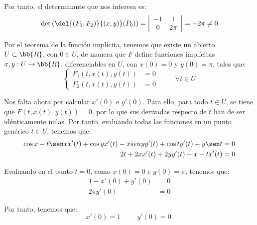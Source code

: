 \begin{ejercicio}
    Por tanto, el determinante que nos interesa es:
    \begin{equation*}
        \det \left( \del{(F_1,F_2)}{(x,y)}(P_0) \right) =
        \left|
            \begin{array}{cc}
                -1 & 1 \\
                0 & 2\pi
            \end{array}
        \right| = -2\pi \neq 0
    \end{equation*}

    Por el teorema de la función implícita, tenemos que existe un abierto $U\subset \bb{R}$,
    con $0\in U$, de manera que $F$ define funciones implícitas $x,y:U\to \bb{R}$, diferenciables en $U$,
    con $x(0)=0$ y $y(0)=\pi$, tales que:
    \begin{equation}
        \left\{
            \begin{array}{ll}
                F_1(t,x(t),y(t)) &= 0 \\
                F_2(t,x(t),y(t)) &= 0
            \end{array}
        \right. \hspace{1cm} \forall t\in U
    \end{equation}

    Nos falta ahora por calcular $x'(0)$ e $y'(0)$. Para ello, para todo $t\in U$, se tiene que $F(t,x(t),y(t))=0$,
    por lo que sus derivadas respecto de $t$ han de ser idénticamente nulas.
    Por tanto, evaluando todas las funciones en un punto genérico $t\in U$, tenemos que:
    \begin{align*}
        \cos x -t\sen xx'(t) +\cos yx'(t) - xsen yy'(t) +\cos ty'(t) -y\sen t&= 0 \\ 
        2t + 2x x'(t) +2y y'(t) - x -tx'(t) &= 0
    \end{align*}

    Evaluando en el punto $t=0$, como $x(0)=0$ e $y(0)=\pi$, tenemos que:
    \begin{align*}
        1 -x'(0) +y'(0) &= 0\\
        2\pi y'(0) &= 0
    \end{align*}

    Por tanto, tenemos que:
    \begin{equation*}
        x'(0) = 1 \hspace{1cm}
        y'(0) = 0.
    \end{equation*}
\end{ejercicio}


